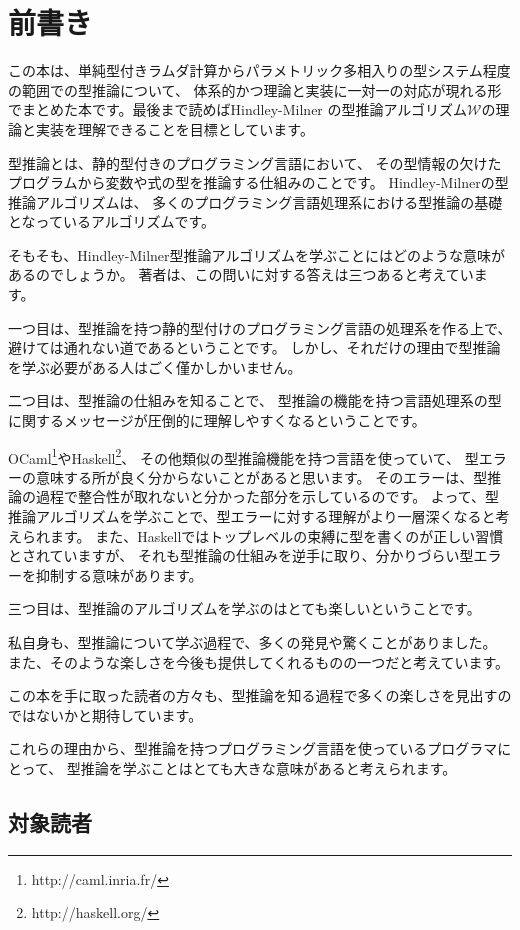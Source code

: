 
\chapter{前書き}

この本は、単純型付きラムダ計算からパラメトリック多相入りの型システム程度の範囲での型推論について、
体系的かつ理論と実装に一対一の対応が現れる形でまとめた本です。最後まで読めばHindley-Milner
の型推論アルゴリズム$\mathcal W$の理論と実装を理解できることを目標としています。

型推論とは、静的型付きのプログラミング言語において、
その型情報の欠けたプログラムから変数や式の型を推論する仕組みのことです。
Hindley-Milnerの型推論アルゴリズムは、
多くのプログラミング言語処理系における型推論の基礎となっているアルゴリズムです。

そもそも、Hindley-Milner型推論アルゴリズムを学ぶことにはどのような意味があるのでしょうか。
著者は、この問いに対する答えは三つあると考えています。

一つ目は、型推論を持つ静的型付けのプログラミング言語の処理系を作る上で、
避けては通れない道であるということです。
しかし、それだけの理由で型推論を学ぶ必要がある人はごく僅かしかいません。

二つ目は、型推論の仕組みを知ることで、
型推論の機能を持つ言語処理系の型に関するメッセージが圧倒的に理解しやすくなるということです。

OCaml\footnote{http://caml.inria.fr/}やHaskell\footnote{http://haskell.org/}、
その他類似の型推論機能を持つ言語を使っていて、
型エラーの意味する所が良く分からないことがあると思います。
そのエラーは、型推論の過程で整合性が取れないと分かった部分を示しているのです。
よって、型推論アルゴリズムを学ぶことで、型エラーに対する理解がより一層深くなると考えられます。
また、Haskellではトップレベルの束縛に型を書くのが正しい習慣とされていますが、
それも型推論の仕組みを逆手に取り、分かりづらい型エラーを抑制する意味があります。

三つ目は、型推論のアルゴリズムを学ぶのはとても楽しいということです。

私自身も、型推論について学ぶ過程で、多くの発見や驚くことがありました。
また、そのような楽しさを今後も提供してくれるものの一つだと考えています。

この本を手に取った読者の方々も、型推論を知る過程で多くの楽しさを見出すのではないかと期待しています。

これらの理由から、型推論を持つプログラミング言語を使っているプログラマにとって、
型推論を学ぶことはとても大きな意味があると考えられます。

\section*{対象読者}

